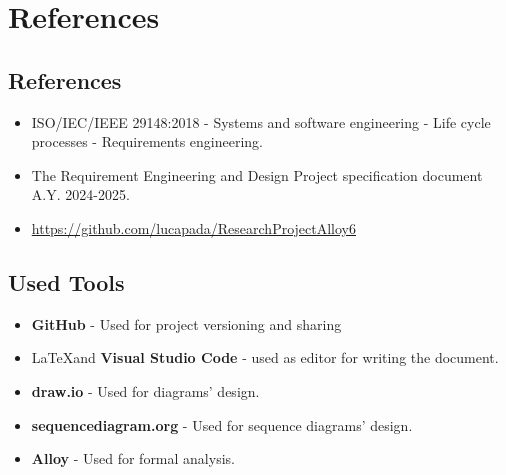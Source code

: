 \chapter{References}
\label{ch:references}

\section{References}
\label{sec:references}

\begin{itemize}
    \item ISO/IEC/IEEE 29148:2018 - Systems and software engineering - Life cycle processes - Requirements engineering.
    \item The Requirement Engineering and Design Project specification document A.Y. 2024-2025.
    \item \url{https://github.com/lucapada/ResearchProjectAlloy6}
\end{itemize}

\section{Used Tools}
\label{sec:used-tools}

\begin{itemize}
    \item \textbf{GitHub} - Used for project versioning and sharing
    \item \LaTeX \space and \textbf{Visual Studio Code} - used as editor for writing the document.
    \item \textbf{draw.io} - Used for diagrams' design.
    \item \textbf{sequencediagram.org} - Used for sequence diagrams' design.
    \item \textbf{Alloy} - Used for formal analysis.
    
\end{itemize}